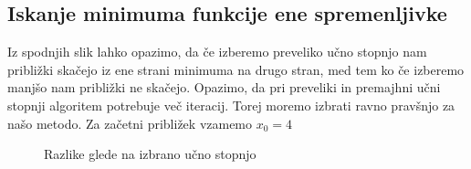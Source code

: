 \documentclass{article}
\begin{document}
\subsection{Iskanje minimuma funkcije ene spremenljivke}

Iz spodnjih slik lahko opazimo, da če izberemo preveliko učno stopnjo nam približki skačejo iz ene strani minimuma na drugo stran, med tem ko če izberemo manjšo nam približki ne skačejo. Opazimo, da pri preveliki in premajhni učni stopnji algoritem potrebuje več iteracij. Torej moremo izbrati ravno pravšnjo za našo metodo. Za začetni približek vzamemo $x_0 = 4$

\begin{figure}[h]
    \centering
    \caption{Razlike glede na izbrano učno stopnjo}
    \label{fig:foobar}
\end{figure}
\end{document}
